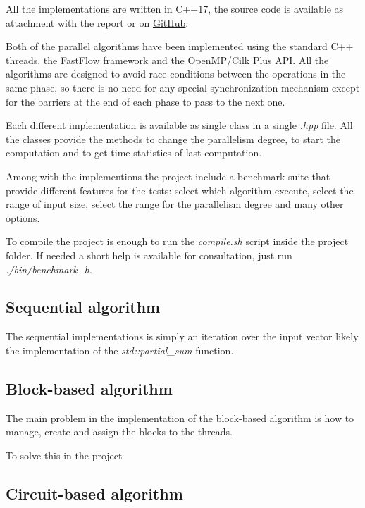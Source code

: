 \documentclass{article}
\begin{document}
All the implementations are written in C++17, the source code is available as attachment with the report or on \href{https://github.com/GaspareG/ParallelPrefix}{GitHub}.

Both of the parallel algorithms have been implemented using the standard C++ threads, the FastFlow framework and the OpenMP/Cilk Plus API. All the algorithms are designed to avoid race conditions between the operations in the same phase, so there is no need for any special synchronization mechanism except for the barriers at the end of each phase to pass to the next one.

Each different implementation is available as single class in a single \textit{.hpp} file. All the classes provide the methods to change the parallelism degree, to start the computation and to get time statistics of last computation.

\smallskip

Among with the implementions the project include a benchmark suite that provide different features for the tests: select which algorithm execute, select the range of input size, select the range for the parallelism degree and many other options.

\smallskip

To compile the project is enough to run the \textit{compile.sh} script inside the project folder.
If needed a short help is available for consultation, just run \textit{./bin/benchmark -h}.

\subsection{Sequential algorithm}

The sequential implementations is simply an iteration over the input vector likely the implementation of the \textit{std::partial\_sum} function.

\subsection{Block-based algorithm}

The main problem in the implementation of the block-based algorithm is how to manage, create and assign the blocks to the threads.

To solve this in the project 

\subsection{Circuit-based algorithm}
\end{document}
